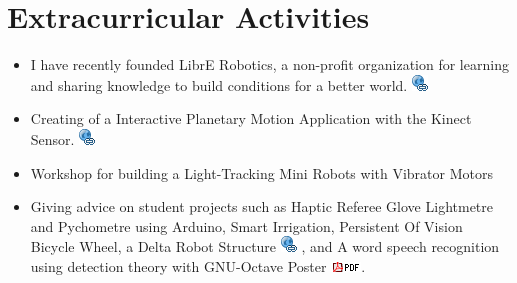 \documentclass[10pt]{article}
\begin{document}
    



    
  \section*{Extracurricular Activities}
  
  \begin{itemize}
    \setlength{\itemsep}{0pt}
  \setlength{\parskip}{0pt}
\item I have recently founded LibrE Robotics, a non-profit organization 
for learning and sharing knowledge to build conditions for a better world.  \href{https://sites.google.com/site/librerobotics/}{\includegraphics[scale=.3]{link_url_icon} } 
\item Creating of a Interactive Planetary Motion Application with the Kinect Sensor.  \href{https://sites.google.com/site/perezxochicale/projects/iss}{\includegraphics[scale=.3]{link_url_icon} }
\item Workshop for building a Light-Tracking Mini Robots with Vibrator Motors
\item Giving advice on student projects such as 
Haptic Referee Glove Lightmetre and Pychometre using Arduino, Smart Irrigation,
Persistent Of Vision Bicycle Wheel, a Delta Robot Structure \href{https://sites.google.com/site/perezxochicaleprojects/studentprojects}{\includegraphics[scale=.3]{link_url_icon}}
, and A word speech recognition using detection theory with GNU-Octave Poster
\href{https://sites.google.com/site/perezxochicale/docs/wr.pdf}{\includegraphics[scale=.5]{icon_pdf_small}}.

\end{itemize}


  
  
  
     
    
\end{document}
